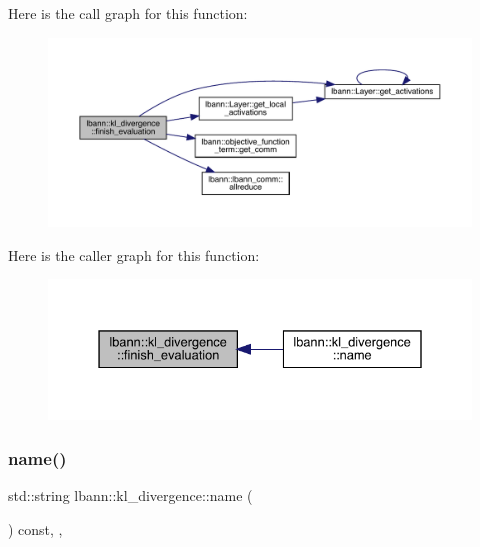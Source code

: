 Here is the call graph for this function\+:\nopagebreak
\begin{figure}[H]
\begin{center}
\leavevmode
\includegraphics[width=350pt]{classlbann_1_1kl__divergence_a93aab2ca89cdaab075a940184ae209d5_cgraph}
\end{center}
\end{figure}
Here is the caller graph for this function\+:\nopagebreak
\begin{figure}[H]
\begin{center}
\leavevmode
\includegraphics[width=331pt]{classlbann_1_1kl__divergence_a93aab2ca89cdaab075a940184ae209d5_icgraph}
\end{center}
\end{figure}
\mbox{\label{classlbann_1_1kl__divergence_a42f016a75f640cb4ec9ceb9320da4a47}} 
\subsubsection{\texorpdfstring{name()}{name()}}
{\footnotesize\ttfamily std\+::string lbann\+::kl\+\_\+divergence\+::name (\begin{DoxyParamCaption}{ }\end{DoxyParamCaption}) const\hspace{0.3cm}{\ttfamily [inline]}, {\ttfamily [override]}, {\ttfamily [virtual]}}

